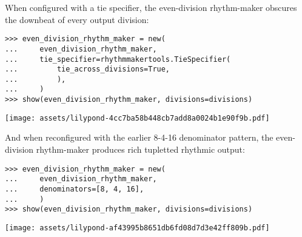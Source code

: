 \noindent When configured with a tie specifier, the even-division rhythm-maker
obscures the downbeat of every output division:

\begin{comment}
<abjad>
even_division_rhythm_maker = new(
    even_division_rhythm_maker,
    tie_specifier=rhythmmakertools.TieSpecifier(
        tie_across_divisions=True,
        ),
    )
show(even_division_rhythm_maker, divisions=divisions)
</abjad>
\end{comment}

\begin{abjadbookoutput}
\begin{singlespacing}
\vspace{-0.5\baselineskip}
\begin{verbatim}
>>> even_division_rhythm_maker = new(
...     even_division_rhythm_maker,
...     tie_specifier=rhythmmakertools.TieSpecifier(
...         tie_across_divisions=True,
...         ),
...     )
>>> show(even_division_rhythm_maker, divisions=divisions)
\end{verbatim}
\noindent\texttt{[image: assets/lilypond-4cc7ba58b448cb7add8a0024b1e90f9b.pdf]}
\end{singlespacing}
\end{abjadbookoutput}

\noindent And when reconfigured with the earlier 8-4-16 denominator pattern,
the even-division rhythm-maker produces rich tupletted rhythmic output:

\begin{comment}
<abjad>
even_division_rhythm_maker = new(
    even_division_rhythm_maker,
    denominators=[8, 4, 16],
    )
show(even_division_rhythm_maker, divisions=divisions)
</abjad>
\end{comment}

\begin{abjadbookoutput}
\begin{singlespacing}
\vspace{-0.5\baselineskip}
\begin{verbatim}
>>> even_division_rhythm_maker = new(
...     even_division_rhythm_maker,
...     denominators=[8, 4, 16],
...     )
>>> show(even_division_rhythm_maker, divisions=divisions)
\end{verbatim}
\noindent\texttt{[image: assets/lilypond-af43995b8651db6fd08d7d3e42ff809b.pdf]}
\end{singlespacing}
\end{abjadbookoutput}

